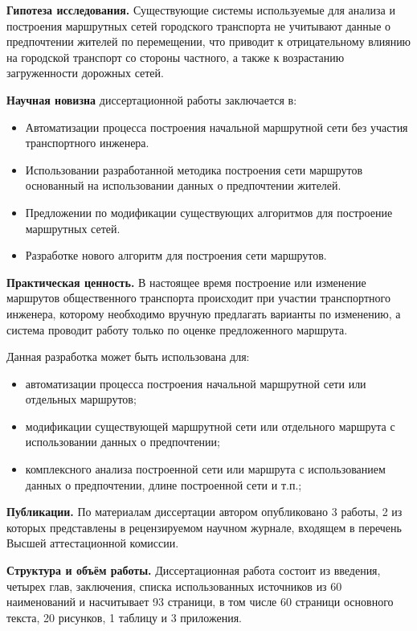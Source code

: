 \textbf{Гипотеза исследования.} Существующие системы используемые для анализа и построения маршрутных сетей 
городского транспорта не учитывают данные о предпочтении жителей по перемещении, что приводит к отрицательному 
влиянию на городской транспорт со стороны частного, а также к возрастанию загруженности дорожных сетей.

\textbf{Научная новизна} диссертационной работы заключается в:
\begin{itemize}
    \item Автоматизации процесса построения начальной маршрутной сети без участия транспортного инженера.
    \item Использовании разработанной методика построения сети маршрутов основанный на использовании данных о 
        предпочтении жителей.
    \item Предложении по модификации существующих алгоритмов для построение маршрутных сетей.
    \item Разработке нового алгоритм для построения сети маршрутов.
\end{itemize}

\textbf{Практическая ценность.}
В настоящее время построение или изменение маршрутов общественного транспорта происходит при участии 
транспортного инженера, которому необходимо вручную предлагать варианты по изменению, а система проводит 
работу только по оценке предложенного маршрута. 

Данная разработка может быть использована для:
\begin{itemize}
    \item автоматизации процесса построения начальной маршрутной сети или отдельных маршрутов;
    \item модификации существующей маршрутной сети или отдельного маршрута с использовании данных о 
        предпочтении;
    \item комплексного анализа построенной сети или маршрута с использованием данных о предпочтении, длине 
        построенной сети и т.п.;
\end{itemize}

\textbf{Публикации.} По материалам диссертации автором опубликовано 3 работы, 2 из которых представлены 
в рецензируемом научном журнале, входящем в перечень Высшей аттестационной комиссии. 

\textbf{Структура и объём работы.} Диссертационная работа состоит из введения, четырех глав, заключения, 
списка использованных источников из 60 наименований и насчитывает 93 страници, в том числе 60
страници основного текста, 20 рисунков, 1 таблицу и 3 приложения.

